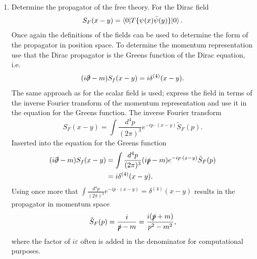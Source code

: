 \begin{enumerate}
\item Determine the propagator of the free theory. For the Dirac field
\begin{equation}
	S_F(x-y)=\braket{0|T\{\psi(x)\bar{\psi}(y)\}|0}.
\end{equation} 
Once again the definitions of the fields can be used to determine the form of the propagator in position space. To determine the momentum representation use that the Dirac propagator is the Greens function of the Dirac equation, i.e.
\begin{equation}
	(i\slashed \partial-m)S_f(x-y)=i\delta^{(4)}(x-y).
\end{equation} 
The same approach as for the scalar field is used; express the field in terms of the inverse Fourier transform of the momentum representation and use it in the equation for the Greens function. The inverse Fourier transform
\begin{equation}
	S_F(x-y)=\int \frac{d^4p}{(2\pi)^3}e^{-ip\cdot(x-y)}\tilde{S}_F(p).
\end{equation} 
Inserted into the equation for the Greens function
\begin{equation}
	\begin{split}
		(i\slashed \partial-m)S_f(x-y)&=\int \frac{d^4p}{(2\pi)^3}(i\slashed p-m)e^{-ip\cdot(x-y)}\tilde{S}_F(p)\\
		&=i\delta^{(4)}(x-y).
	\end{split}
\end{equation} 
Using once more that $\int \frac{d^4p}{(2\pi)^4}e^{-ip\cdot(x-y)}=\delta^{(4)}(x-y)$ results in the propagator in momentum space
\begin{equation}
	\tilde{S}_F(p)=\frac{i}{\slashed p-m}=\frac{i(\slashed p+m)}{p^2-m^2},
\end{equation} 
where the factor of $i\varepsilon$ often is added in the denominator for computational purposes. 
\end{enumerate}

